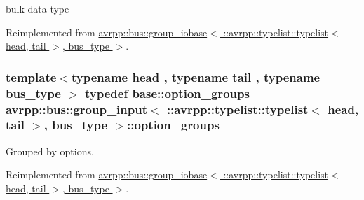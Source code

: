 bulk data type 



Reimplemented from \hyperlink{structavrpp_1_1bus_1_1group__iobase_3_01_1_1avrpp_1_1typelist_1_1typelist_3_01head_00_01tail_01_4_00_01bus__type_01_4_a143651b666f2d9a6e9f236b04b6dbb52}{avrpp::bus::group\_\-iobase$<$ ::avrpp::typelist::typelist$<$ head, tail $>$, bus\_\-type $>$}.

\hypertarget{structavrpp_1_1bus_1_1group__input_3_01_1_1avrpp_1_1typelist_1_1typelist_3_01head_00_01tail_01_4_00_01bus__type_01_4_a839b778c3b94a101da470fa0563ee178}{
\subsubsection[{option\_\-groups}]{\setlength{\rightskip}{0pt plus 5cm}template$<$typename head , typename tail , typename bus\_\-type $>$ typedef base::option\_\-groups avrpp::bus::group\_\-input$<$ ::{\bf avrpp::typelist::typelist}$<$ head, tail $>$, bus\_\-type $>$::{\bf option\_\-groups}}}
\label{structavrpp_1_1bus_1_1group__input_3_01_1_1avrpp_1_1typelist_1_1typelist_3_01head_00_01tail_01_4_00_01bus__type_01_4_a839b778c3b94a101da470fa0563ee178}


Grouped by options. 



Reimplemented from \hyperlink{structavrpp_1_1bus_1_1group__iobase_3_01_1_1avrpp_1_1typelist_1_1typelist_3_01head_00_01tail_01_4_00_01bus__type_01_4_ac3e03bebeadefc2d2c4ad6a0b6b49899}{avrpp::bus::group\_\-iobase$<$ ::avrpp::typelist::typelist$<$ head, tail $>$, bus\_\-type $>$}.



